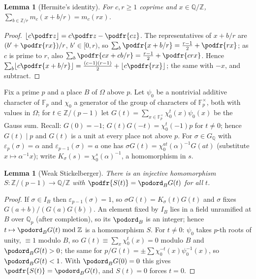 \documentclass[10pt]{amsart}
\newtheorem{lemma}[theorem]{Lemma}
\theoremstyle{definition}
\theoremstyle{remark}
\newcommand{\Z}{\mathbb Z}
\newcommand{\Q}{\mathbb Q}
\begin{document}
\begin{lemma}[Hermite's identity]\label{pod:hermite}
For $c,r\ge1$ coprime and $x\in\Q/\Z$, $\sum_{b\in\Z/r}m_c(x+b/r)=m_c(rx)$.
\end{lemma}
\begin{proof}
$\lfloor c\podfr z\rfloor=c\podfr z-\podfr{cz}$. The representatives of $x+b/r$ are
$(b'+\podfr{rx})/r$, $b'\in[0,r)$, so $\sum_b\podfr{x+b/r}=\frac{r-1}2+\podfr{rx}$; as $c$ is prime to
$r$, also $\sum_b\podfr{cx+cb/r}=\frac{r-1}2+\podfr{crx}$. Hence $\sum_b\lfloor c\podfr{x+b/r}\rfloor=
\frac{(c-1)(r-1)}2+\lfloor c\podfr{rx}\rfloor$; the same with $-x$, and subtract.
\end{proof}

Fix a prime $p$ and a place $B$ of $\Omega$ above $p$. Let $\psi_0$ be a nontrivial additive
character of $\mathbb F_p$ and $\chi_0$ a generator of the group of characters of $\mathbb F_p^\times$,
both with values in $\Omega$; for $t\in\Z/(p-1)$ let $G(t)=\sum_{x\in\mathbb F_p^\times}\chi_0^t(x)
\psi_0(x)$ be the Gauss sum. Recall: $G(0)=-1$; $G(t)G(-t)=\chi_0^t(-1)p$ for $t\ne0$; hence $G(t)\mid
p$ and $G(t)$ is a unit at every place not above $p$. For $\sigma\in G_\Q$ with $\varepsilon_p(\sigma)
=\alpha$ and $\varepsilon_{p-1}(\sigma)=a$ one has $\sigma G(t)=\chi_0^{at}(\alpha)^{-1}G(at)$
(substitute $x\mapsto\alpha^{-1}x$); write $K_\sigma(s)=\chi_0^s(\alpha)^{-1}$, a homomorphism in $s$.

\begin{lemma}[Weak Stickelberger]\label{pod:stick}
There is an injective homomorphism $S\colon\Z/(p-1)\to\Q/\Z$ with $\podfr{S(t)}=\podord_B G(t)$ for
all $t$.
\end{lemma}
\begin{proof}
If $\sigma\in I_B$ then $\varepsilon_{p-1}(\sigma)=1$, so $\sigma G(t)=K_\sigma(t)G(t)$ and
$\sigma$ fixes $G(a+b)/(G(a)G(b))$. An element fixed by $I_B$ lies in a field unramified at $B$ over
$\Q_p$ (after completion), so its $\podord_B$ is an integer; hence $t\mapsto\podord_BG(t)\bmod\Z$ is a
homomorphism $S$. For $t\ne0$: $\psi_0$ takes $p$-th roots of unity, $\equiv1$ modulo $B$, so
$G(t)\equiv\sum_x\chi_0^t(x)=0$ modulo $B$ and $\podord_BG(t)>0$; the same for $p/G(t)=\pm
\sum\chi_0^{-t}(x)\psi_0^{-1}(x)$, so $\podord_BG(t)<1$. With $\podord_BG(0)=0$ this gives
$\podfr{S(t)}=\podord_BG(t)$, and $S(t)=0$ forces $t=0$.
\end{proof}
\end{document}
